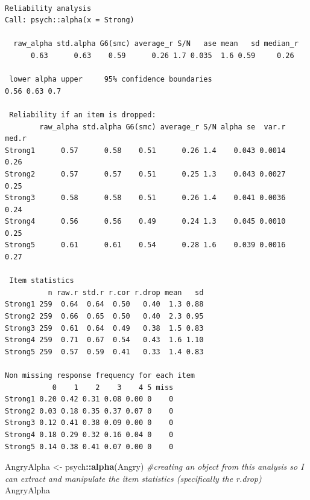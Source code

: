 \documentclass[
  english,
]{book}
\newenvironment{Shaded}{\begin{snugshade}}{\end{snugshade}}
\newcommand{\CommentTok}[1]{\textcolor[rgb]{0.56,0.35,0.01}{\textit{#1}}}
\newcommand{\KeywordTok}[1]{\textcolor[rgb]{0.13,0.29,0.53}{\textbf{#1}}}
\newcommand{\NormalTok}[1]{#1}
\newcommand{\OperatorTok}[1]{\textcolor[rgb]{0.81,0.36,0.00}{\textbf{#1}}}
\newcommand{\StringTok}[1]{\textcolor[rgb]{0.31,0.60,0.02}{#1}}
\begin{document}
\begin{verbatim}

Reliability analysis   
Call: psych::alpha(x = Strong)

  raw_alpha std.alpha G6(smc) average_r S/N   ase mean   sd median_r
      0.63      0.63    0.59      0.26 1.7 0.035  1.6 0.59     0.26

 lower alpha upper     95% confidence boundaries
0.56 0.63 0.7 

 Reliability if an item is dropped:
        raw_alpha std.alpha G6(smc) average_r S/N alpha se  var.r med.r
Strong1      0.57      0.58    0.51      0.26 1.4    0.043 0.0014  0.26
Strong2      0.57      0.57    0.51      0.25 1.3    0.043 0.0027  0.25
Strong3      0.58      0.58    0.51      0.26 1.4    0.041 0.0036  0.24
Strong4      0.56      0.56    0.49      0.24 1.3    0.045 0.0010  0.25
Strong5      0.61      0.61    0.54      0.28 1.6    0.039 0.0016  0.27

 Item statistics 
          n raw.r std.r r.cor r.drop mean   sd
Strong1 259  0.64  0.64  0.50   0.40  1.3 0.88
Strong2 259  0.66  0.65  0.50   0.40  2.3 0.95
Strong3 259  0.61  0.64  0.49   0.38  1.5 0.83
Strong4 259  0.71  0.67  0.54   0.43  1.6 1.10
Strong5 259  0.57  0.59  0.41   0.33  1.4 0.83

Non missing response frequency for each item
           0    1    2    3    4 5 miss
Strong1 0.20 0.42 0.31 0.08 0.00 0    0
Strong2 0.03 0.18 0.35 0.37 0.07 0    0
Strong3 0.12 0.41 0.38 0.09 0.00 0    0
Strong4 0.18 0.29 0.32 0.16 0.04 0    0
Strong5 0.14 0.38 0.41 0.07 0.00 0    0
\end{verbatim}

\begin{Shaded}
\begin{Highlighting}[]
\NormalTok{AngryAlpha <-}\StringTok{ }\NormalTok{psych}\OperatorTok{::}\KeywordTok{alpha}\NormalTok{(Angry) }\CommentTok{#creating an object from this analysis so I can extract and manipulate the item statistics (specifically the r.drop)}
\NormalTok{AngryAlpha}
\end{Highlighting}
\end{Shaded}
\end{document}
